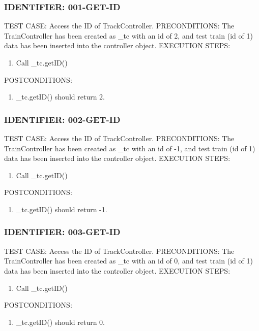 \documentclass{scrreprt}
\begin{document}
\subsubsection{IDENTIFIER: 001-GET-ID}
TEST CASE: Access the ID of TrackController.
PRECONDITIONS: The TrainController has been created as _tc with an id of 2, and test train (id of 1) data has been inserted into the controller object.
EXECUTION STEPS:
\begin{enumerate}
	\item Call _tc.getID()
\end{enumerate}
POSTCONDITIONS:
\begin{enumerate}
	\item _tc.getID() should return 2.
\end{enumerate}

\subsubsection{IDENTIFIER: 002-GET-ID}
TEST CASE: Access the ID of TrackController.
PRECONDITIONS: The TrainController has been created as _tc with an id of -1, and test train (id of 1) data has been inserted into the controller object.
EXECUTION STEPS:
\begin{enumerate}
	\item Call _tc.getID()
\end{enumerate}
POSTCONDITIONS:
\begin{enumerate}
	\item _tc.getID() should return -1.
\end{enumerate}

\subsubsection{IDENTIFIER: 003-GET-ID}
TEST CASE: Access the ID of TrackController.
PRECONDITIONS: The TrainController has been created as _tc with an id of 0, and test train (id of 1) data has been inserted into the controller object.
EXECUTION STEPS:
\begin{enumerate}
	\item Call _tc.getID()
\end{enumerate}
POSTCONDITIONS:
\begin{enumerate}
	\item _tc.getID() should return 0.
\end{enumerate}
\end{document}
